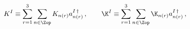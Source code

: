 \begin{equation}
K^I \equiv \sum_{r=1}^3\sum_{n\in\Zop}K_{n(r)}a_{n(r)}^{I\,\dag}\,,\qquad
\K^I \equiv \sum_{r=1}^3\sum_{n\in\Zop}\K_{n(r)}a_{n(r)}^{I\,\dag}\,,
\end{equation}

